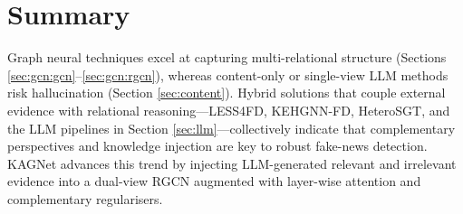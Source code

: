 \section{Summary}
Graph neural techniques excel at capturing multi-relational structure (Sections \ref{sec:gcn:gcn}–\ref{sec:gcn:rgcn}), whereas content-only or single-view LLM methods risk hallucination (Section \ref{sec:content}).  
Hybrid solutions that couple external evidence with relational reasoning—LESS4FD, KEHGNN-FD, HeteroSGT, and the LLM pipelines in Section \ref{sec:llm}—collectively indicate that complementary perspectives and knowledge injection are key to robust fake-news detection.  
KAGNet advances this trend by injecting LLM-generated relevant and irrelevant evidence into a dual-view RGCN augmented with layer-wise attention and complementary regularisers.


